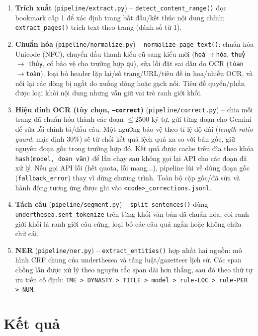 \documentclass[12pt,a4paper]{article}
\begin{document}
\begin{enumerate}
  \item \textbf{Trích xuất} (\texttt{pipeline/extract.py}) --
    \texttt{detect\_content\_range()} đọc bookmark cấp 1 để xác định trang bắt
    đầu/kết thúc nội dung chính; \texttt{extract\_pages()} trích text theo
    trang (đánh số từ 1).
  \item \textbf{Chuẩn hóa} (\texttt{pipeline/normalize.py}) --
    \texttt{normalize\_page\_text()}: chuẩn hóa Unicode (NFC), chuyển dấu thanh
    kiểu cũ sang kiểu mới (\texttt{hoà}$\to$\texttt{hòa}, \texttt{thuỷ}$\to$
    \texttt{thủy}, có bảo vệ cho trường hợp \texttt{qu}), sửa lỗi đặt sai dấu
    do OCR (\texttt{tòan}$\to$\texttt{toàn}), loại bỏ header lặp lại/số
    trang/URL/tiêu đề in hoa/nhiễu OCR, và nối lại các dòng bị ngắt do xuống
    dòng hoặc gạch nối. Tiêu đề quyển/phần được loại khỏi nội dung nhưng vẫn
    giữ vai trò ranh giới khối.
  \item \textbf{Hiệu đính OCR (tùy chọn, \texttt{--correct})}
    (\texttt{pipeline/correct.py}) -- chia mỗi trang đã chuẩn hóa thành các
    đoạn $\le 2500$ ký tự, gửi từng đoạn cho Gemini để sửa lỗi chính tả/dấu
    câu. Một ngưỡng bảo vệ theo tỉ lệ độ dài (\emph{length-ratio guard}, mặc
    định 30\%) sẽ từ chối kết quả lệch quá xa so với bản gốc, giữ nguyên đoạn
    gốc trong trường hợp đó. Kết quả được cache trên đĩa theo khóa
    \texttt{hash(model, đoạn văn)} để lần chạy sau không gọi lại API cho các
    đoạn đã xử lý. Nếu gọi API lỗi (hết quota, lỗi mạng...), pipeline lùi về
    dùng đoạn gốc (\texttt{fallback\_error}) thay vì dừng chương trình. Toàn bộ
    cặp gốc/đã sửa và hành động tương ứng được ghi vào
    \texttt{<code>\_corrections.jsonl}.
  \item \textbf{Tách câu} (\texttt{pipeline/segment.py}) --
    \texttt{split\_sentences()} dùng \texttt{underthesea.sent\_tokenize} trên
    từng khối văn bản đã chuẩn hóa, coi ranh giới khối là ranh giới câu cứng,
    loại bỏ các câu quá ngắn hoặc không chứa chữ cái.
  \item \textbf{NER} (\texttt{pipeline/ner.py}) --
    \texttt{extract\_entities()} hợp nhất hai nguồn: mô hình CRF chung của
    underthesea và tầng luật/gazetteer lịch sử. Các span chồng lấn được xử lý
    theo nguyên tắc span dài hơn thắng, sau đó theo thứ tự ưu tiên cố định:
    \texttt{TME > DYNASTY > TITLE > model > rule-LOC > rule-PER > NUM}.
\end{enumerate}

\section{Kết quả}
\end{document}
